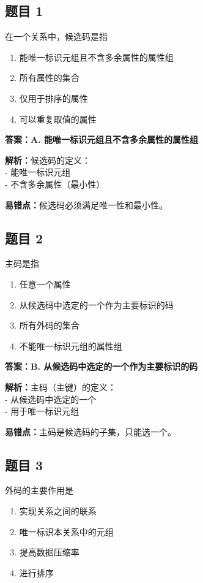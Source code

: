 \documentclass[12pt,a4paper]{ctexart}
\begin{document}
\subsection*{题目 1}
在一个关系中，候选码是指
\begin{enumerate}[label=\Alph*.]
	\item 能唯一标识元组且不含多余属性的属性组
	\item 所有属性的集合
	\item 仅用于排序的属性
	\item 可以重复取值的属性
\end{enumerate}

\begin{answerbox}
	\textbf{答案：A. 能唯一标识元组且不含多余属性的属性组}

	\textbf{解析：}候选码的定义：\\
	- 能唯一标识元组\\
	- 不含多余属性（最小性）

	\textbf{易错点：}候选码必须满足唯一性和最小性。
\end{answerbox}

\subsection*{题目 2}
主码是指
\begin{enumerate}[label=\Alph*.]
	\item 任意一个属性
	\item 从候选码中选定的一个作为主要标识的码
	\item 所有外码的集合
	\item 不能唯一标识元组的属性组
\end{enumerate}

\begin{answerbox}
	\textbf{答案：B. 从候选码中选定的一个作为主要标识的码}

	\textbf{解析：}主码（主键）的定义：\\
	- 从候选码中选定的一个\\
	- 用于唯一标识元组

	\textbf{易错点：}主码是候选码的子集，只能选一个。
\end{answerbox}

\subsection*{题目 3}
外码的主要作用是
\begin{enumerate}[label=\Alph*.]
	\item 实现关系之间的联系
	\item 唯一标识本关系中的元组
	\item 提高数据压缩率
	\item 进行排序
\end{enumerate}
\end{document}
